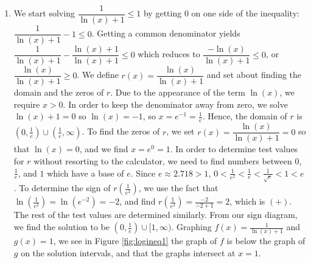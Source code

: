 {
\begin{enumerate}

\item  We start solving $\dfrac{1}{\ln(x)+1} \leq 1$ by getting $0$ on one side of the inequality: $\dfrac{1}{\ln(x)+1}  - 1 \leq 0$.  Getting a common denominator yields $\dfrac{1}{\ln(x)+1}  - \dfrac{\ln(x)+1}{\ln(x)+1} \leq 0$ which reduces to $\dfrac{-\ln(x)}{\ln(x)+1} \leq 0$, or $ \dfrac{\ln(x)}{\ln(x)+1} \geq 0$.  We define $r(x) = \dfrac{\ln(x)}{\ln(x)+1}$ and set about finding the domain and the zeros of $r$.  Due to the appearance of the term $\ln(x)$, we require  $x > 0$.  In order to keep the denominator away from zero, we solve $\ln(x)+1 = 0$ so $\ln(x) = -1$, so $x = e^{-1} = \frac{1}{e}$.  Hence, the domain of $r$ is $\left(0, \frac{1}{e}\right) \cup \left(\frac{1}{e}, \infty\right)$.  To find the zeros of $r$, we set $r(x) = \dfrac{\ln(x)}{\ln(x)+1} = 0$ so that $\ln(x) = 0$, and we find $x = e^{0} = 1$.  In order to determine test values for $r$ without resorting to the calculator, we need to find numbers between $0$, $\frac{1}{e}$, and $1$ which have a base of $e$.  Since $e \approx 2.718 > 1$, $0 < \frac{1}{e^2} < \frac{1}{e} < \frac{1}{\sqrt{e}} < 1 < e$.  To determine the sign of $r\left( \frac{1}{e^2} \right)$, we use the fact that $\ln\left(\frac{1}{e^2}\right) = \ln\left(e^{-2}\right) = -2$, and find $r\left( \frac{1}{e^2} \right) = \frac{-2}{-2+1} = 2$, which is $(+)$.  The rest of the test values are determined similarly.   From our sign diagram, we find the solution to be $\left(0, \frac{1}{e}\right) \cup [1, \infty)$. Graphing $f(x) =  \frac{1}{\ln(x)+1}$ and $g(x) = 1$, we see in Figure \ref{fig:logineq1} the graph of $f$ is below the graph of $g$ on the solution intervals, and that the graphs intersect at $x=1$.

{}




\end{enumerate}}
